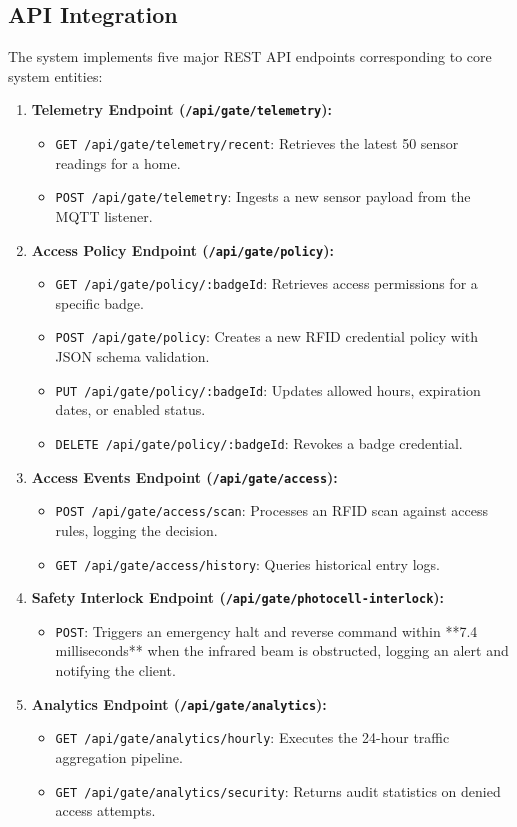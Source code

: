 \documentclass[11pt,a4paper]{article}
\begin{document}
\subsection{API Integration}
The system implements five major REST API endpoints corresponding to core system entities:
\begin{enumerate}
    \item \textbf{Telemetry Endpoint (\texttt{/api/gate/telemetry}):}
    \begin{itemize}[noitemsep]
        \item \texttt{GET /api/gate/telemetry/recent}: Retrieves the latest 50 sensor readings for a home.
        \item \texttt{POST /api/gate/telemetry}: Ingests a new sensor payload from the MQTT listener.
    \end{itemize}
    \item \textbf{Access Policy Endpoint (\texttt{/api/gate/policy}):}
    \begin{itemize}[noitemsep]
        \item \texttt{GET /api/gate/policy/:badgeId}: Retrieves access permissions for a specific badge.
        \item \texttt{POST /api/gate/policy}: Creates a new RFID credential policy with JSON schema validation.
        \item \texttt{PUT /api/gate/policy/:badgeId}: Updates allowed hours, expiration dates, or enabled status.
        \item \texttt{DELETE /api/gate/policy/:badgeId}: Revokes a badge credential.
    \end{itemize}
    \item \textbf{Access Events Endpoint (\texttt{/api/gate/access}):}
    \begin{itemize}[noitemsep]
        \item \texttt{POST /api/gate/access/scan}: Processes an RFID scan against access rules, logging the decision.
        \item \texttt{GET /api/gate/access/history}: Queries historical entry logs.
    \end{itemize}
    \item \textbf{Safety Interlock Endpoint (\texttt{/api/gate/photocell-interlock}):}
    \begin{itemize}[noitemsep]
        \item \texttt{POST}: Triggers an emergency halt and reverse command within **7.4 milliseconds** when the infrared beam is obstructed, logging an alert and notifying the client.
    \end{itemize}
    \item \textbf{Analytics Endpoint (\texttt{/api/gate/analytics}):}
    \begin{itemize}[noitemsep]
        \item \texttt{GET /api/gate/analytics/hourly}: Executes the 24-hour traffic aggregation pipeline.
        \item \texttt{GET /api/gate/analytics/security}: Returns audit statistics on denied access attempts.
    \end{itemize}
\end{enumerate}
\end{document}
